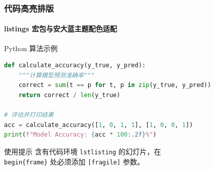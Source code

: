 \begin{frame}[fragile]
\frametitle{代码高亮排版}
\framesubtitle{listings 宏包与安大蓝主题配色适配}

\begin{block}{Python 算法示例}
\begin{lstlisting}[language=Python]
def calculate_accuracy(y_true, y_pred):
    """计算模型预测准确率"""
    correct = sum(t == p for t, p in zip(y_true, y_pred))
    return correct / len(y_true)

# 评估并打印结果
acc = calculate_accuracy([1, 0, 1, 1], [1, 0, 0, 1])
print(f"Model Accuracy: {acc * 100:.2f}%")
\end{lstlisting}
\end{block}

\vspace{-0.2em}
\begin{minipage}{0.84\linewidth}
\begin{alertblock}{使用提示}
含有代码环境 \texttt{lstlisting} 的幻灯片，在 \texttt{\\begin\{frame\}} 处必须添加 \texttt{[fragile]} 参数。
\end{alertblock}
\end{minipage}
\end{frame}
